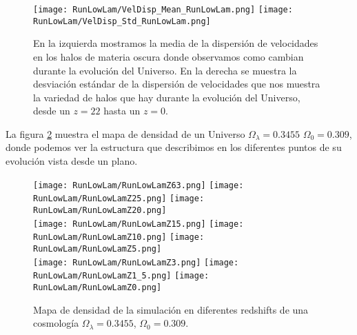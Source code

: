 \begin{figure}[H]
    \centering
    \texttt{[image: RunLowLam/VelDisp\_Mean\_RunLowLam.png]}
    \texttt{[image: RunLowLam/VelDisp\_Std\_RunLowLam.png]}
    \caption[Media y desviación estándar de la dispersión de velocidades]{\footnotesize En la izquierda mostramos la media de la dispersión de velocidades en los halos de materia oscura donde observamos como cambian durante la evolución del Universo. En la derecha se muestra la desviación estándar de la dispersión de velocidades que nos muestra la variedad de halos que hay durante la evolución del Universo, desde un $z=22$ hasta un $z=0$.}
    \label{fig:LowLam-VelDispStats}
\end{figure}

La figura \ref{fig:LowLam-DensityMap} muestra el mapa de densidad de un Universo $\Omega_\lambda = 0.3455$ $\Omega_0 = 0.309$, donde podemos ver la estructura que describimos en los diferentes puntos de su evolución vista desde un plano.
\begin{figure}[H]
    \centering

    \texttt{[image: RunLowLam/RunLowLamZ63.png]}   %
    \texttt{[image: RunLowLam/RunLowLamZ25.png]}   %
    \texttt{[image: RunLowLam/RunLowLamZ20.png]}   %
    \\
    \texttt{[image: RunLowLam/RunLowLamZ15.png]}   %
    \texttt{[image: RunLowLam/RunLowLamZ10.png]}   %
    \texttt{[image: RunLowLam/RunLowLamZ5.png]}    %
    \\
    \texttt{[image: RunLowLam/RunLowLamZ3.png]}    %
    \texttt{[image: RunLowLam/RunLowLamZ1\_5.png]}  %
    \texttt{[image: RunLowLam/RunLowLamZ0.png]}    %
    \caption[Mapa de densidad en en diferentes redshift]{ \footnotesize Mapa de densidad de la simulación en diferentes redshifts de una cosmología $\Omega_\lambda = 0.3455$, $\Omega_0 = 0.309$. }
    \label{fig:LowLam-DensityMap}
\end{figure}


